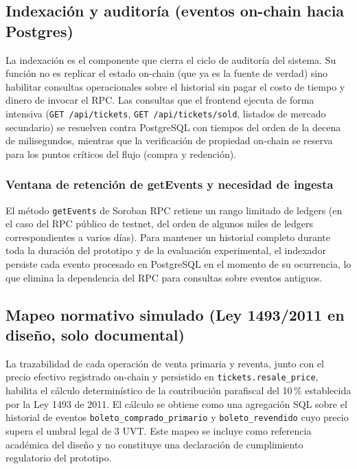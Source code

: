 \subsection{Indexación y auditoría (eventos on-chain hacia Postgres)}

La indexación es el componente que cierra el ciclo de auditoría del sistema. Su función no es replicar el estado on-chain (que ya es la fuente de verdad) sino habilitar consultas operacionales sobre el historial sin pagar el costo de tiempo y dinero de invocar el RPC. Las consultas que el frontend ejecuta de forma intensiva (\texttt{GET /api/tickets}, \texttt{GET /api/tickets/sold}, listados de mercado secundario) se resuelven contra PostgreSQL con tiempos del orden de la decena de milisegundos, mientras que la verificación de propiedad on-chain se reserva para los puntos críticos del flujo (compra y redención).

\subsubsection{Ventana de retención de getEvents y necesidad de ingesta}

El método \texttt{getEvents} de Soroban RPC retiene un rango limitado de ledgers (en el caso del RPC público de testnet, del orden de algunos miles de ledgers correspondientes a varios días). Para mantener un historial completo durante toda la duración del prototipo y de la evaluación experimental, el indexador persiste cada evento procesado en PostgreSQL en el momento de su ocurrencia, lo que elimina la dependencia del RPC para consultas sobre eventos antiguos.

\subsection{Mapeo normativo simulado (Ley 1493/2011 en diseño, solo documental)}

La trazabilidad de cada operación de venta primaria y reventa, junto con el precio efectivo registrado on-chain y persistido en \texttt{tickets.resale\_price}, habilita el cálculo determinístico de la contribución parafiscal del 10\,\% establecida por la Ley 1493 de 2011. El cálculo se obtiene como una agregación SQL sobre el historial de eventos \texttt{boleto\_comprado\_primario} y \texttt{boleto\_revendido} cuyo precio supera el umbral legal de 3 UVT. Este mapeo se incluye como referencia académica del diseño y no constituye una declaración de cumplimiento regulatorio del prototipo.
